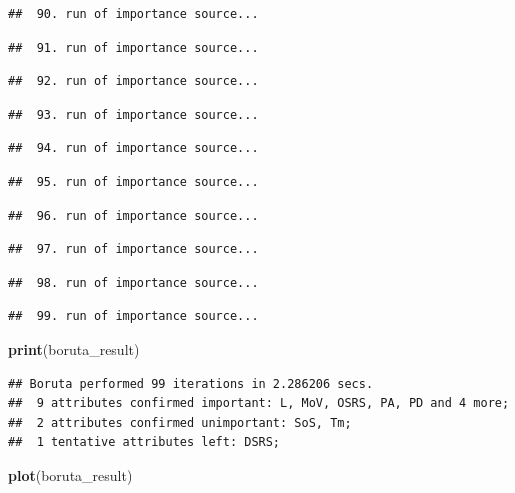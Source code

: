 \documentclass[
]{article}
\newenvironment{Shaded}{\begin{snugshade}}{\end{snugshade}}
\newcommand{\FunctionTok}[1]{\textcolor[rgb]{0.13,0.29,0.53}{\textbf{#1}}}
\newcommand{\NormalTok}[1]{#1}
\begin{document}
\begin{verbatim}
##  90. run of importance source...
\end{verbatim}

\begin{verbatim}
##  91. run of importance source...
\end{verbatim}

\begin{verbatim}
##  92. run of importance source...
\end{verbatim}

\begin{verbatim}
##  93. run of importance source...
\end{verbatim}

\begin{verbatim}
##  94. run of importance source...
\end{verbatim}

\begin{verbatim}
##  95. run of importance source...
\end{verbatim}

\begin{verbatim}
##  96. run of importance source...
\end{verbatim}

\begin{verbatim}
##  97. run of importance source...
\end{verbatim}

\begin{verbatim}
##  98. run of importance source...
\end{verbatim}

\begin{verbatim}
##  99. run of importance source...
\end{verbatim}

\begin{Shaded}
\begin{Highlighting}[]
\FunctionTok{print}\NormalTok{(boruta\_result)}
\end{Highlighting}
\end{Shaded}

\begin{verbatim}
## Boruta performed 99 iterations in 2.286206 secs.
##  9 attributes confirmed important: L, MoV, OSRS, PA, PD and 4 more;
##  2 attributes confirmed unimportant: SoS, Tm;
##  1 tentative attributes left: DSRS;
\end{verbatim}

\begin{Shaded}
\begin{Highlighting}[]
\FunctionTok{plot}\NormalTok{(boruta\_result)}
\end{Highlighting}
\end{Shaded}
\end{document}
